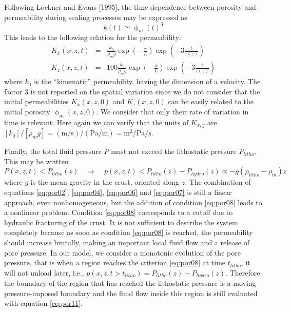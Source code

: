 Following Lockner and Evans [1995], the time
dependence between porosity and permeability during sealing 
processes may be expressed as
\begin{equation}
k(t) \simeq \upphi_m(t)^3
\label{eq:por05}
\end{equation}
This leads to the following relation for the permeability:
\begin{eqnarray}
K_x(x,z,t) &=& \frac{k_0 }{\rho_m g}  \exp\left(-\frac{x}{L}\right) \exp\left(-3\frac{t}{\tau(z)}\right) \label{eq:por06}\\
K_z(x,z,t) &=& 100\frac{k_0 }{\rho_m g}  \exp\left(-\frac{x}{L}\right) \exp\left(-3\frac{t}{\tau(z)}\right)
 \label{eq:por07}
\end{eqnarray}
where $k_0$ is the ``kinematic'' permeability, having the
dimension of a velocity. The factor 3 is not reported on the
spatial variation since we do not consider that the initial
permeabilities $K_x (x, z,0)$ and $K_z (x, z,0)$ can be easily related
to the initial porosity $\upphi_m (x,z,0)$. We consider that only their
rate of variation in time is relevant. 
Here again we can verify that the units of $K_{x,y}$ are 
$[k_0]/[\rho_m g]=(\si{\meter\per\second})/(\si{\pascal}/\si{\meter})
=\si{\square\meter\per\pascal\per\second}$.

Finally, the total fluid pressure $P$ 
must not exceed the lithostatic pressure $P_{litho}$. This may
be written
\begin{equation}
P(x,z,t)<P_{litho}(z) \quad\Rightarrow\quad
p(x,z,t)<P_{litho}(z)-P_{hydro}(z) \propto -g(\rho_{litho}-\rho_m)z
\label{eq:por08}
\end{equation}
where $g$ is the mean gravity in the crust, oriented along $z$.
The combination of equations 
\eqref{eq:por02}, \eqref{eq:por04}, \eqref{eq:por06} and \eqref{eq:por07} is still a
linear approach, even nonhomogeneous, but the addition of
condition \eqref{eq:por08} leads to a nonlinear problem. Condition \eqref{eq:por08}
corresponds to a cutoff due to hydraulic fracturing of the
crust. It is not sufficient to describe the system completely
because as soon as condition \eqref{eq:por08} is reached, the
permeability should increase brutally, making an important
local fluid flow and a release of pore pressure. In our model,
we consider a monotonic evolution of the pore pressure, that
is when a region reaches the criterion \eqref{eq:por08} at time $t_{litho}$, it
will not unload later, i.e., $p(x,z,t > t_{litho}) = P_{litho}(z)-P_{hydro}(z)$.
Therefore the boundary of the region that has reached the
lithostatic pressure is a moving pressure-imposed boundary
and the fluid flow inside this region is still evaluated with
equation \eqref{eq:por11}.

